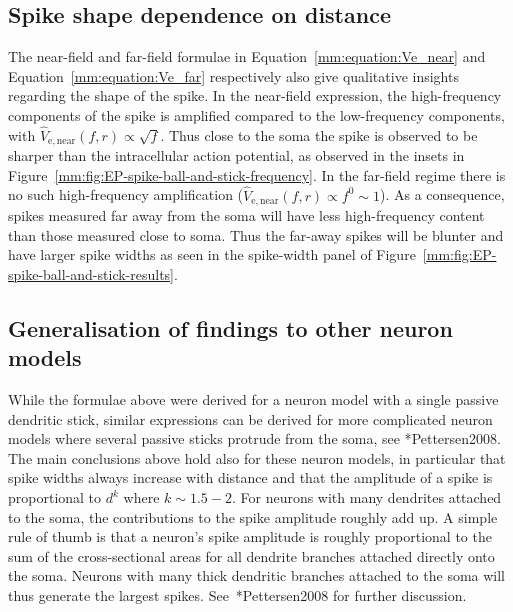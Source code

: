 \subsection{Spike shape dependence on distance}
The near-field and far-field formulae in Equation~\ref{mm:equation:Ve_near} and Equation~\ref{mm:equation:Ve_far} respectively also give qualitative insights regarding the shape of the spike. In the near-field expression, the high-frequency components of the spike is amplified 
compared to the low-frequency components, with $\hat{V}_\mathrm{e,near}(f,r) \propto \sqrt{f}$.
Thus close to the soma the spike is observed to be sharper than the intracellular action potential,
as observed in the insets in Figure~\ref{mm:fig:EP-spike-ball-and-stick-frequency}. 
In the far-field regime there is no such high-frequency amplification ($\hat{V}_\mathrm{e,near}(f,r) \propto f^0 \sim 1$).
As a consequence, spikes measured far away from the soma will have less high-frequency content than those measured close to soma.
Thus the far-away spikes will be blunter and have larger spike widths as seen in the spike-width panel of 
Figure~\ref{mm:fig:EP-spike-ball-and-stick-results}.

\subsection{Generalisation of findings to other neuron models}
While the formulae above were derived for a neuron model with a single passive dendritic stick, similar expressions can be derived for 
more complicated neuron models where several passive sticks protrude from the soma, see \citeasnoun**{Pettersen2008}.
The main conclusions above hold also for these neuron models, in particular that spike widths always increase with distance and that
the amplitude of a spike is proportional to $d^{k}$ where $k\sim1.5-2$. For neurons with many dendrites attached to the 
soma, the contributions to the spike amplitude roughly add up. A simple rule of thumb is that a neuron's spike amplitude is 
roughly proportional to the sum of the cross-sectional areas for all dendrite branches attached directly onto the soma. Neurons with many thick
dendritic branches attached to the soma will thus generate the largest spikes. See~\citeasnoun**{Pettersen2008} for further discussion.


